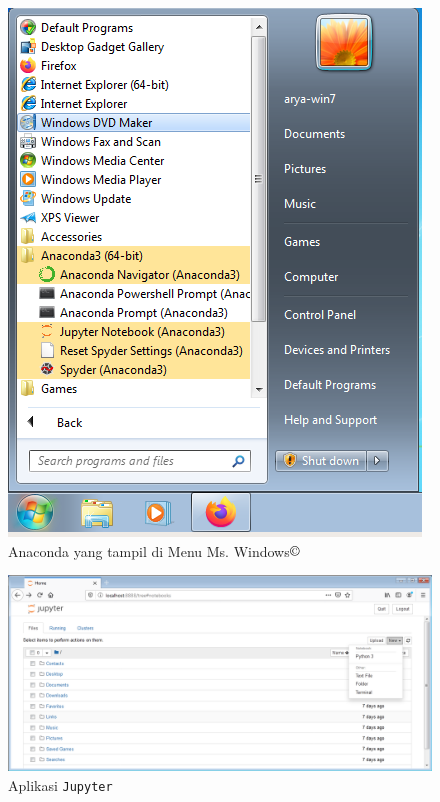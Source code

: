 \begin{figure}
  \begin{center}
    \includegraphics[scale=.5]{pics/anacondaMenu2.png}
    \caption{Anaconda yang tampil di Menu Ms. Windows$\copyright$}
    \label{fig:menuAnaconda}
  \end{center}
\end{figure}

\begin{figure}
  \begin{center}
    \includegraphics[scale=.5]{pics/jupyter2.png}
    \caption{Aplikasi \texttt{Jupyter}}
    \label{fig:jupyter}
  \end{center}
\end{figure}

